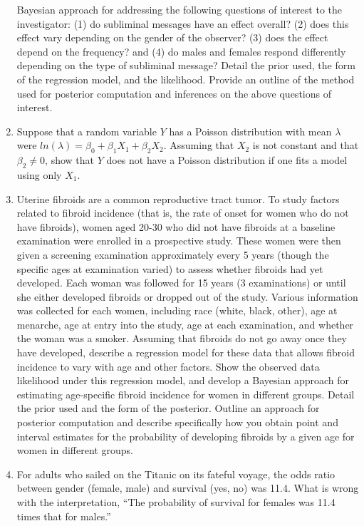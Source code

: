 \documentclass[
]{article}
\begin{document}
\begin{enumerate}
  Bayesian approach for addressing the following questions of interest
  to the investigator: (1) do subliminal messages have an effect
  overall? (2) does this effect vary depending on the gender of the
  observer? (3) does the effect depend on the frequency? and (4) do
  males and females respond differently depending on the type of
  subliminal message? Detail the prior used, the form of the regression
  model, and the likelihood. Provide an outline of the method used for
  posterior computation and inferences on the above questions of
  interest. \vspace{0px}
\item
  Suppose that a random variable \(Y\) has a Poisson distribution with
  mean \(\lambda\) were
  \(ln(\lambda) = \beta_0 + \beta_1 X_1 + \beta_2 X_2\). Assuming that
  \(X_2\) is not constant and that \(\beta_2 \ne 0\), show that \(Y\)
  does not have a Poisson distribution if one fits a model using only
  \(X_1\). \vspace{0px}
\item
  Uterine fibroids are a common reproductive tract tumor. To study
  factors related to fibroid incidence (that is, the rate of onset for
  women who do not have fibroids), women aged 20-30 who did not have
  fibroids at a baseline examination were enrolled in a prospective
  study. These women were then given a screening examination
  approximately every 5 years (though the specific ages at examination
  varied) to assess whether fibroids had yet developed. Each woman was
  followed for 15 years (3 examinations) or until she either developed
  fibroids or dropped out of the study. Various information was
  collected for each women, including race (white, black, other), age at
  menarche, age at entry into the study, age at each examination, and
  whether the woman was a smoker. \newline Assuming that fibroids do not
  go away once they have developed, describe a regression model for
  these data that allows fibroid incidence to vary with age and other
  factors. Show the observed data likelihood under this regression
  model, and develop a Bayesian approach for estimating age-specific
  fibroid incidence for women in different groups. Detail the prior used
  and the form of the posterior. Outline an approach for posterior
  computation and describe specifically how you obtain point and
  interval estimates for the probability of developing fibroids by a
  given age for women in different groups. \vspace{0px}
\item
  For adults who sailed on the Titanic on its fateful voyage, the odds
  ratio between gender (female, male) and survival (yes, no) was 11.4.
  What is wrong with the interpretation, ``The probability of survival
  for females was 11.4 times that for males.''
\end{enumerate}
\end{document}
